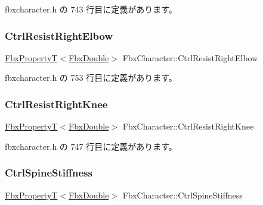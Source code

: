  fbxcharacter.\+h の 743 行目に定義があります。

\mbox{\label{class_fbx_character_a7cfbb020fdafa4044c51dfd2e4bcf708}} 
\subsubsection{\texorpdfstring{Ctrl\+Resist\+Right\+Elbow}{CtrlResistRightElbow}}
{\footnotesize\ttfamily \hyperlink{class_fbx_property_t}{Fbx\+PropertyT}$<$\hyperlink{fbxtypes_8h_a171e72a1c46fc15c1a6c9c31948c1c5b}{Fbx\+Double}$>$ Fbx\+Character\+::\+Ctrl\+Resist\+Right\+Elbow}



 fbxcharacter.\+h の 753 行目に定義があります。

\mbox{\label{class_fbx_character_a6dcc989f37036f3a5cb7d972c3bb1b68}} 
\subsubsection{\texorpdfstring{Ctrl\+Resist\+Right\+Knee}{CtrlResistRightKnee}}
{\footnotesize\ttfamily \hyperlink{class_fbx_property_t}{Fbx\+PropertyT}$<$\hyperlink{fbxtypes_8h_a171e72a1c46fc15c1a6c9c31948c1c5b}{Fbx\+Double}$>$ Fbx\+Character\+::\+Ctrl\+Resist\+Right\+Knee}



 fbxcharacter.\+h の 747 行目に定義があります。

\mbox{\label{class_fbx_character_af9bb40b8da6dfc8e72c4e5d735cbd1e5}} 
\subsubsection{\texorpdfstring{Ctrl\+Spine\+Stiffness}{CtrlSpineStiffness}}
{\footnotesize\ttfamily \hyperlink{class_fbx_property_t}{Fbx\+PropertyT}$<$\hyperlink{fbxtypes_8h_a171e72a1c46fc15c1a6c9c31948c1c5b}{Fbx\+Double}$>$ Fbx\+Character\+::\+Ctrl\+Spine\+Stiffness}



